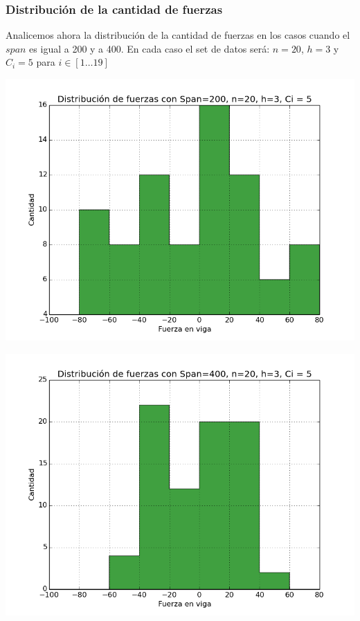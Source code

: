 \subsubsection{Distribución de la cantidad de fuerzas}

Analicemos ahora la distribución de la cantidad de fuerzas en los casos cuando el $span$ es igual a 200 y a 400. En cada caso el set de datos será: $n = 20$, $h = 3$ y $C_i = 5$ para $i \in [1 \dots 19]$

\begin{center}
\includegraphics[scale=0.8]{archivos/graficos/hist_200.png}\\
\end{center}

\begin{center}
\includegraphics[scale=0.8]{archivos/graficos/hist_400.png}\\
\end{center}

